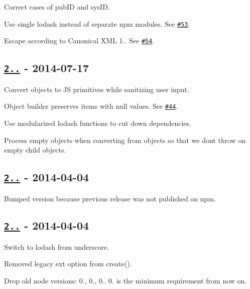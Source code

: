\begin{DoxyItemize}
\item Correct cases of pub\+ID and sys\+ID.
\item Use single lodash instead of separate npm modules. See \href{https://github.com/oozcitak/xmlbuilder-js/issues/53}{\tt \#53}.
\item Escape according to Canonical X\+ML 1.. See \href{https://github.com/oozcitak/xmlbuilder-js/issues/54}{\tt \#54}.
\end{DoxyItemize}

\subsection*{\href{https://github.com/oozcitak/xmlbuilder-js/compare/v2.2.1...v2.3.0}{\tt 2..} -\/ 2014-\/07-\/17}


\begin{DoxyItemize}
\item Convert objects to JS primitives while sanitizing user input.
\item Object builder preserves items with null values. See \href{https://github.com/oozcitak/xmlbuilder-js/issues/44}{\tt \#44}.
\item Use modularized lodash functions to cut down dependencies.
\item Process empty objects when converting from objects so that we don\textquotesingle{}t throw on empty child objects.
\end{DoxyItemize}

\subsection*{\href{https://github.com/oozcitak/xmlbuilder-js/compare/v2.2.0...v2.2.1}{\tt 2..} -\/ 2014-\/04-\/04}


\begin{DoxyItemize}
\item Bumped version because previous release was not published on npm.
\end{DoxyItemize}

\subsection*{\href{https://github.com/oozcitak/xmlbuilder-js/compare/v2.1.0...v2.2.0}{\tt 2..} -\/ 2014-\/04-\/04}


\begin{DoxyItemize}
\item Switch to lodash from underscore.
\item Removed legacy {\ttfamily ext} option from {\ttfamily create()}.
\item Drop old node versions\+: 0., 0., 0.. 0. is the minimum requirement from now on.
\end{DoxyItemize}

